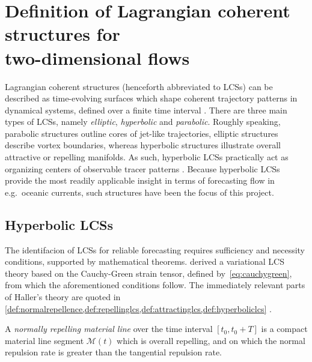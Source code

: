 \section[Definition of Lagrangian Coherent Structures for two-dimensional flows ]
{Definition of Lagrangian coherent structures for\\\phantom{2.3 }two-dimensional flows}
\label{sec:definition_of_lcss_for_two-dimensional_flow}
Lagrangian coherent structures (henceforth abbreviated to LCSs) can be described
as time-evolving surfaces which shape coherent trajectory patterns in dynamical
systems, defined over a finite time interval \parencite{haller2010variational}.
There are three main types of LCSs, namely \emph{elliptic},
\emph{hyperbolic} and \emph{parabolic}. Roughly speaking, parabolic structures
outline cores of jet-like trajectories, elliptic structures describe vortex
boundaries, whereas hyperbolic structures illustrate overall attractive or
repelling manifolds. As such, hyperbolic LCSs practically act as organizing
centers of observable tracer patterns \parencite{onu2015lcstool}. Because
hyperbolic LCSs provide the most readily applicable insight in terms of
forecasting flow in e.g.\ oceanic currents, such structures have been the focus
of this project.

\clearpage

\subsection{Hyperbolic LCSs}
\label{sub:hyperbolic_lcss}

The identifacion of LCSs for reliable forecasting requires sufficiency and necessity
conditions, supported by mathematical theorems. \textcite{haller2010variational}
derived a variational LCS theory based on the Cauchy-Green strain tensor,
defined by~\cref{eq:cauchygreen}, from which the aforementioned
conditions follow. The immediately relevant parts of Haller's theory
are quoted in
\cref{def:normalrepellence,def:repellinglcs,def:attractinglcs,def:hyperboliclcs}
\parencite{haller2010variational}.\\

\begin{defn}
    \label{def:normalrepellence}
    A \emph{normally repelling material line} over the time interval
    $[t_{0},t_{0}+T]$ is a compact material line segment $\mathcal{M}(t)$
    which is overall repelling, and on which the normal repulsion rate
    is greater than the tangential repulsion rate.
\end{defn}

